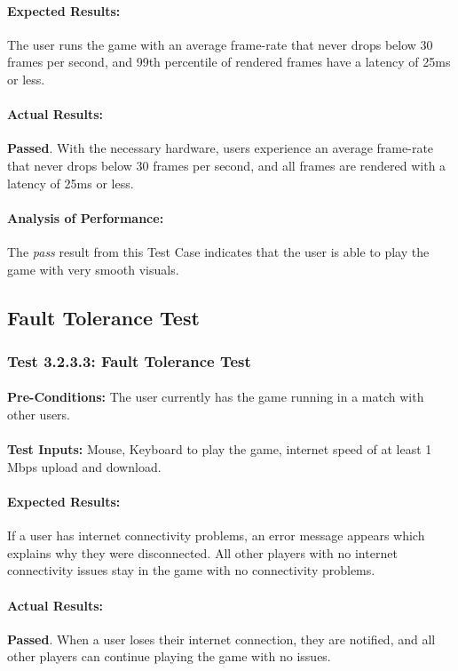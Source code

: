 \documentclass{article}
\begin{document}
    \paragraph{Expected Results:} The user runs the game with an average frame-rate that never drops below 30 frames per second, and 99th percentile of rendered frames have a latency of 25ms or less.
    \paragraph{Actual Results:} \textbf{Passed}. With the necessary hardware, users experience an average frame-rate that never drops below 30 frames per second, and all frames are rendered with a latency of 25ms or less. 
    \paragraph{Analysis of Performance:} The \emph{pass} result from this Test Case indicates that the user is able to play the game with very smooth visuals.
\subsection{Fault Tolerance Test}
\subsubsection{Test 3.2.3.3: Fault Tolerance Test }
    \paragraph{}\textbf{Pre-Conditions:} The user currently has the game running in a match with other users.
    \paragraph{}\textbf{Test Inputs:} Mouse, Keyboard to play the game, internet speed of at least 1 Mbps upload and download.
    \paragraph{Expected Results:} If a user has internet connectivity problems, an error message appears which explains why they were disconnected. All other players with no internet connectivity issues stay in the game with no connectivity problems. 
    \paragraph{Actual Results:} \textbf{Passed}. When a user loses their internet connection, they are notified, and all other players can continue playing the game with no issues.
\end{document}
